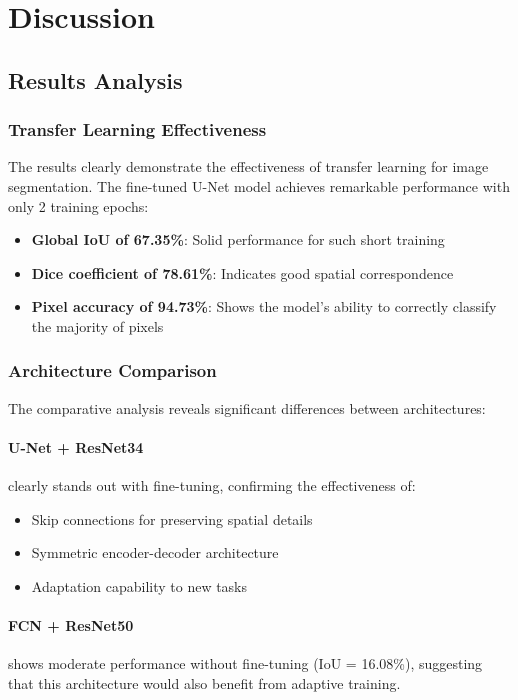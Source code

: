 \documentclass[12pt,a4paper]{article}
\begin{document}
\section{Discussion}

\subsection{Results Analysis}

\subsubsection{Transfer Learning Effectiveness}

The results clearly demonstrate the effectiveness of transfer learning for image segmentation. The fine-tuned U-Net model achieves remarkable performance with only 2 training epochs:
\begin{itemize}
    \item \textbf{Global IoU of 67.35\%}: Solid performance for such short training
    \item \textbf{Dice coefficient of 78.61\%}: Indicates good spatial correspondence
    \item \textbf{Pixel accuracy of 94.73\%}: Shows the model's ability to correctly classify the majority of pixels
\end{itemize}

\subsubsection{Architecture Comparison}

The comparative analysis reveals significant differences between architectures:

\paragraph{U-Net + ResNet34} clearly stands out with fine-tuning, confirming the effectiveness of:
\begin{itemize}
    \item Skip connections for preserving spatial details
    \item Symmetric encoder-decoder architecture
    \item Adaptation capability to new tasks
\end{itemize}

\paragraph{FCN + ResNet50} shows moderate performance without fine-tuning (IoU = 16.08\%), suggesting that this architecture would also benefit from adaptive training.
\end{document}
